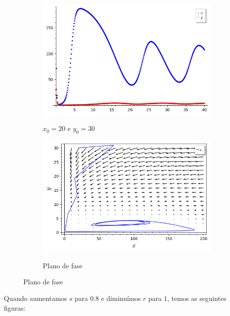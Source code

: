 \begin{figure}[H]
    \centering
    \begin{subfigure}{0.4\textwidth}
        \includegraphics[scale=0.48]{figuras/HT_5.png}
        \label{fig:HT_5}
        \caption{$x_0 = 20$ e $y_0 = 30$}
    \end{subfigure}
    \begin{subfigure}{0.4\textwidth}
        \includegraphics[scale=0.48]{figuras/HT_6.png}
        \label{fig:HT_6}
        \caption{Plano de fase}
    \end{subfigure}
\end{figure}

Quando aumentamos $s$ para $0.8$ e diminuímos $r$ para $1$, temos as seguintes figuras:

